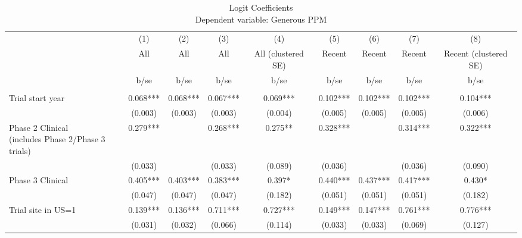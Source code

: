 
\begin{table}[htb]\centering
\caption{Logit Coefficients \\ Dependent variable: Generous PPM}
\begin{tabular}{l*{8}c}

 & (1) & (2) & (3) & (4) & (5) & (6) & (7) & (8)  \\
 & All & All & All & All (clustered SE) & Recent & Recent & Recent & Recent (clustered SE)  \\

                    &        b/se   &        b/se   &        b/se   &        b/se   &        b/se   &        b/se   &        b/se   &        b/se   \\

\hline

       &               &               &               &               &               &               &               &               \\
Trial start year    &       0.068***&       0.068***&       0.067***&       0.069***&       0.102***&       0.102***&       0.102***&       0.104***\\
                    &     (0.003)   &     (0.003)   &     (0.003)   &     (0.004)   &     (0.005)   &     (0.005)   &     (0.005)   &     (0.006)   \\
\shortstack[l]{Phase 2 Clinical\\(includes Phase 2/Phase 3 trials)} &       0.279***&               &       0.268***&       0.275** &       0.328***&               &       0.314***&       0.322***\\
                    &     (0.033)   &               &     (0.033)   &     (0.089)   &     (0.036)   &               &     (0.036)   &     (0.090)   \\
Phase 3 Clinical    &       0.405***&       0.403***&       0.383***&       0.397*  &       0.440***&       0.437***&       0.417***&       0.430*  \\
                    &     (0.047)   &     (0.047)   &     (0.047)   &     (0.182)   &     (0.051)   &     (0.051)   &     (0.051)   &     (0.182)   \\
Trial site in US=1  &       0.139***&       0.136***&       0.711***&       0.727***&       0.149***&       0.147***&       0.761***&       0.776***\\
                    &     (0.031)   &     (0.032)   &     (0.066)   &     (0.114)   &     (0.033)   &     (0.033)   &     (0.069)   &     (0.127)   \\

\end{tabular}
\end{table}
